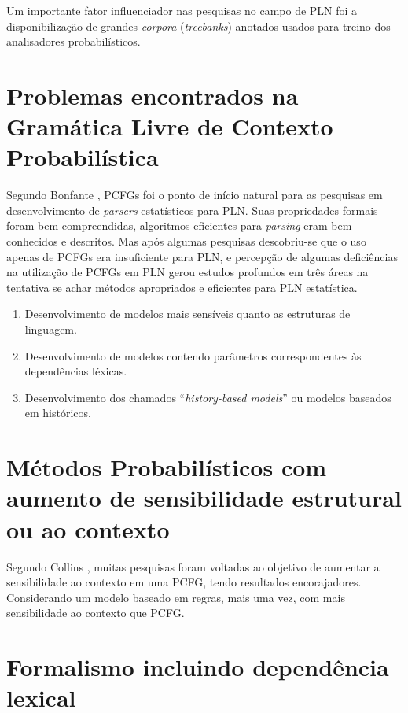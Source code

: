 Um importante fator influenciador nas pesquisas no campo de PLN foi a disponibilização de grandes \emph{corpora} (\emph{treebanks}) anotados usados para treino dos analisadores probabilísticos.

\section{Problemas encontrados  na Gramática Livre de Contexto Probabilística}
\label{sec:prob_encontrados}

Segundo Bonfante \cite{bonfante03}, PCFGs foi o ponto de início natural para as pesquisas em desenvolvimento de \emph{parsers} estatísticos para PLN. Suas propriedades formais foram bem compreendidas, algoritmos eficientes para \emph{parsing} eram bem conhecidos e descritos. Mas após algumas  pesquisas descobriu-se que o uso apenas de PCFGs era insuficiente para PLN, e percepção de algumas deficiências na utilização de PCFGs em PLN gerou estudos profundos em três áreas na tentativa se achar métodos apropriados e eficientes para PLN estatística.

\begin{enumerate}
  \item Desenvolvimento de modelos mais sensíveis quanto as estruturas de linguagem.
  \item Desenvolvimento de modelos contendo parâmetros correspondentes às dependências léxicas.
  \item Desenvolvimento dos chamados ``\emph{history-based models}'' ou modelos baseados em históricos.
\end{enumerate}

\section{Métodos Probabilísticos com aumento de sensibilidade estrutural ou ao contexto}
\label{sec:aumento_sensibilidade}

Segundo Collins \cite{collins99}, muitas pesquisas foram voltadas ao objetivo de aumentar a sensibilidade ao contexto em uma PCFG, tendo resultados encorajadores. Considerando um modelo baseado em regras, mais uma vez, com mais sensibilidade ao contexto que PCFG. 

\section{Formalismo incluindo dependência lexical}
\label{sec:dependencia_lexical}

